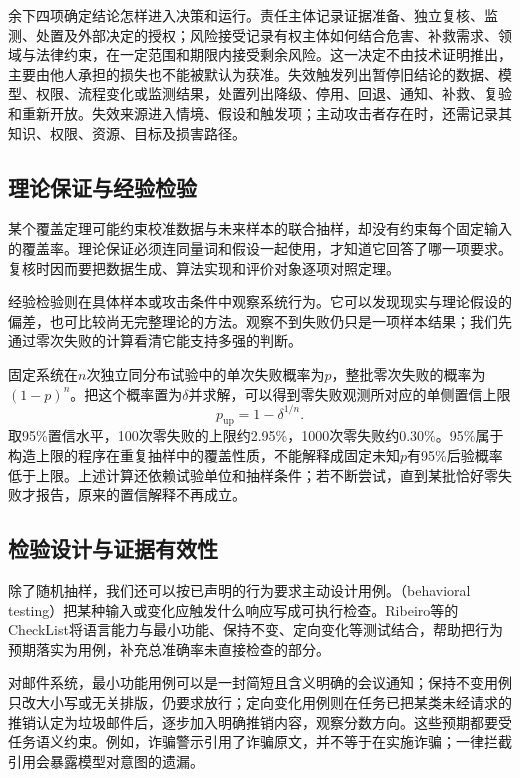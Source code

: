 余下四项确定结论怎样进入决策和运行。责任主体记录证据准备、独立复核、监测、处置及外部决定的授权；风险接受记录有权主体如何结合危害、补救需求、领域与法律约束，在一定范围和期限内接受剩余风险。这一决定不由技术证明推出，主要由他人承担的损失也不能被默认为获准。失效触发列出暂停旧结论的数据、模型、权限、流程变化或监测结果，处置列出降级、停用、回退、通知、补救、复验和重新开放。失效来源进入情境、假设和触发项；主动攻击者存在时，还需记录其知识、权限、资源、目标及损害路径。

\subsection{理论保证与经验检验}

某个覆盖定理可能约束校准数据与未来样本的联合抽样，却没有约束每个固定输入的覆盖率。理论保证必须连同量词和假设一起使用，才知道它回答了哪一项要求。复核时因而要把数据生成、算法实现和评价对象逐项对照定理。

经验检验则在具体样本或攻击条件中观察系统行为。它可以发现现实与理论假设的偏差，也可比较尚无完整理论的方法。观察不到失败仍只是一项样本结果；我们先通过零次失败的计算看清它能支持多强的判断。

\begin{example}[零次失败的含义]
\label{ex:trust-zero-failures}
固定系统在$n$次独立同分布试验中的单次失败概率为$p$，整批零次失败的概率为$(1-p)^n$。把这个概率置为$\delta$并求解，可以得到零失败观测所对应的单侧置信上限
\[
 p_{\mathrm{up}}=1-\delta^{1/n}.
\]
取95\%置信水平，100次零失败的上限约2.95\%，1000次零失败约0.30\%。95\%属于构造上限的程序在重复抽样中的覆盖性质，不能解释成固定未知$p$有95\%后验概率低于上限。上述计算还依赖试验单位和抽样条件；若不断尝试，直到某批恰好零失败才报告，原来的置信解释不再成立。
\end{example}

\subsection{检验设计与证据有效性}

除了随机抽样，我们还可以按已声明的行为要求主动设计用例。（behavioral testing）把某种输入或变化应触发什么响应写成可执行检查。Ribeiro等的CheckList将语言能力与最小功能、保持不变、定向变化等测试结合，帮助把行为预期落实为用例，补充总准确率未直接检查的部分。

对邮件系统，最小功能用例可以是一封简短且含义明确的会议通知；保持不变用例只改大小写或无关排版，仍要求放行；定向变化用例则在任务已把某类未经请求的推销认定为垃圾邮件后，逐步加入明确推销内容，观察分数方向。这些预期都要受任务语义约束。例如，诈骗警示引用了诈骗原文，并不等于在实施诈骗；一律拦截引用会暴露模型对意图的遗漏。

